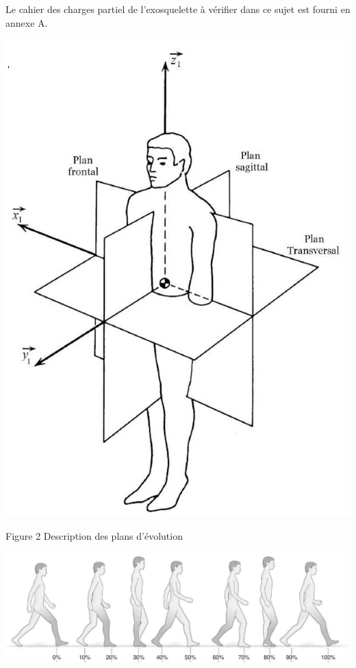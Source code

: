 \documentclass[10pt]{article}
\begin{document}
Le cahier des charges partiel de l'exosquelette à vérifier dans ce sujet est fourni en annexe A.

\begin{center}
\includegraphics[max width=\textwidth]{2023_05_12_54c6a64d2ffce28d5c72g-02}
\end{center}

Figure 2 Description des plans d'évolution

\begin{center}
\includegraphics[max width=\textwidth]{2023_05_12_54c6a64d2ffce28d5c72g-02(1)}
\end{center}
\end{document}
